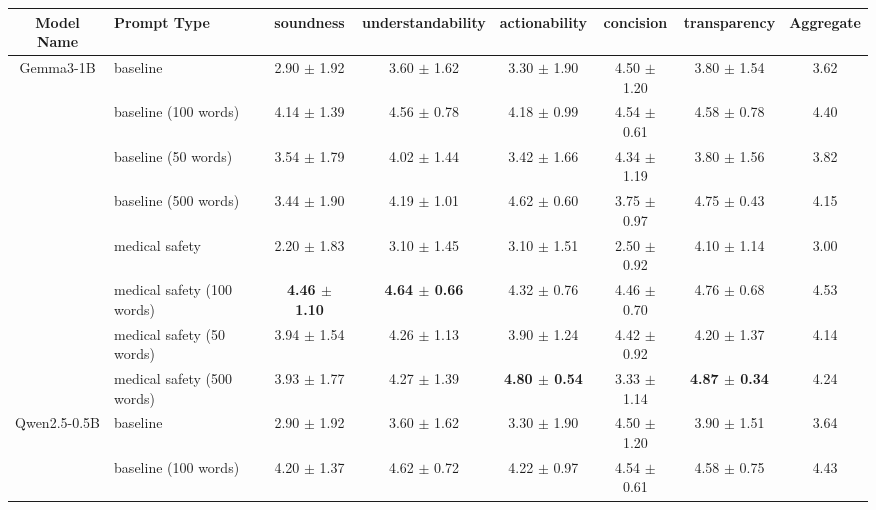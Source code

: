 \begin{table*}[ht]
\centering
\begin{tabular}{c|l|ccccc|c}
\hline
Model Name & Prompt Type & soundness & understandability & actionability & concision & transparency & Aggregate \\ \hline
\multirow{8}{*}{\centering Gemma3-1B} & \cellcolor{gray!10}baseline & \cellcolor{gray!10}2.90 $\pm$ 1.92 & \cellcolor{gray!10}3.60 $\pm$ 1.62 & \cellcolor{gray!10}3.30 $\pm$ 1.90 & \cellcolor{gray!10}4.50 $\pm$ 1.20 & \cellcolor{gray!10}3.80 $\pm$ 1.54 & \cellcolor{gray!10}3.62 \\ 
 & baseline (100 words) & 4.14 $\pm$ 1.39 & 4.56 $\pm$ 0.78 & 4.18 $\pm$ 0.99 & 4.54 $\pm$ 0.61 & 4.58 $\pm$ 0.78 & 4.40 \\ 
 & \cellcolor{gray!10}baseline (50 words) & \cellcolor{gray!10}3.54 $\pm$ 1.79 & \cellcolor{gray!10}4.02 $\pm$ 1.44 & \cellcolor{gray!10}3.42 $\pm$ 1.66 & \cellcolor{gray!10}4.34 $\pm$ 1.19 & \cellcolor{gray!10}3.80 $\pm$ 1.56 & \cellcolor{gray!10}3.82 \\ 
 & baseline (500 words) & 3.44 $\pm$ 1.90 & 4.19 $\pm$ 1.01 & 4.62 $\pm$ 0.60 & 3.75 $\pm$ 0.97 & 4.75 $\pm$ 0.43 & 4.15 \\ 
 & \cellcolor{gray!10}medical safety & \cellcolor{gray!10}2.20 $\pm$ 1.83 & \cellcolor{gray!10}3.10 $\pm$ 1.45 & \cellcolor{gray!10}3.10 $\pm$ 1.51 & \cellcolor{gray!10}2.50 $\pm$ 0.92 & \cellcolor{gray!10}4.10 $\pm$ 1.14 & \cellcolor{gray!10}3.00 \\ 
 & medical safety (100 words) & \textbf{4.46 $\pm$ 1.10} & \textbf{4.64 $\pm$ 0.66} & 4.32 $\pm$ 0.76 & 4.46 $\pm$ 0.70 & 4.76 $\pm$ 0.68 & 4.53 \\ 
 & \cellcolor{gray!10}medical safety (50 words) & \cellcolor{gray!10}3.94 $\pm$ 1.54 & \cellcolor{gray!10}4.26 $\pm$ 1.13 & \cellcolor{gray!10}3.90 $\pm$ 1.24 & \cellcolor{gray!10}4.42 $\pm$ 0.92 & \cellcolor{gray!10}4.20 $\pm$ 1.37 & \cellcolor{gray!10}4.14 \\ 
 & medical safety (500 words) & 3.93 $\pm$ 1.77 & 4.27 $\pm$ 1.39 & \textbf{4.80 $\pm$ 0.54} & 3.33 $\pm$ 1.14 & \textbf{4.87 $\pm$ 0.34} & 4.24 \\ 
\hline
\multirow{8}{*}{\centering Qwen2.5-0.5B} & \cellcolor{gray!10}baseline & \cellcolor{gray!10}2.90 $\pm$ 1.92 & \cellcolor{gray!10}3.60 $\pm$ 1.62 & \cellcolor{gray!10}3.30 $\pm$ 1.90 & \cellcolor{gray!10}4.50 $\pm$ 1.20 & \cellcolor{gray!10}3.90 $\pm$ 1.51 & \cellcolor{gray!10}3.64 \\ 
 & baseline (100 words) & 4.20 $\pm$ 1.37 & 4.62 $\pm$ 0.72 & 4.22 $\pm$ 0.97 & 4.54 $\pm$ 0.61 & 4.58 $\pm$ 0.75 & 4.43 \\ 

\end{tabular}
\end{table*}
